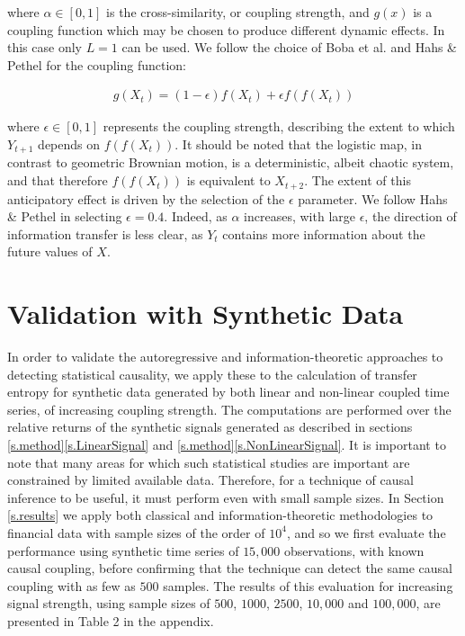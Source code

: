 \documentclass[]{rsos}%
\begin{document}
  where $ \alpha \in [0,1]$ is the cross-similarity, or coupling strength, and $g(x)$ is a coupling function which may be chosen to produce different dynamic effects. In this case only $L=1$ can be used. We follow the choice of Boba et al. \cite{boba2015efficient} and Hahs \& Pethel \cite{hahs2011distinguishing} for the coupling function:

  \begin{eqnarray}
    g(X_t) = (1-\epsilon) f(X_t) + \epsilon f(f(X_t)) 
    \label{eq:g(x)}
  \end{eqnarray}


 where $\epsilon \in [0,1]$ represents the coupling strength, describing the extent to which $Y_{t+1}$ depends on $f(f(X_t))$. It should be noted that the logistic map, in contrast to geometric Brownian motion, is a deterministic, albeit chaotic system, and that therefore $f(f(X_t))$ is equivalent to $X_{t+2}$. {\color{black} The extent of this anticipatory effect is driven by the selection of the $\epsilon$ parameter. We follow Hahs \& Pethel in selecting $\epsilon=0.4$. Indeed, as $\alpha$ increases, with large $\epsilon$, the direction of information transfer is less clear, as $Y_t$ contains more information about the future values of $X$. }



\section{Validation with Synthetic Data} \label{s.validation}

  In order to validate the autoregressive and information-theoretic approaches to detecting statistical causality, we apply these to the calculation of transfer entropy for synthetic data generated by both linear and non-linear coupled time series, of increasing coupling strength. 
  The computations are performed over the relative returns of the synthetic signals generated as described in sections \ref{s.method}\ref{s.LinearSignal} and \ref{s.method}\ref{s.NonLinearSignal}. 
  It is important to note that many areas for which such statistical studies are important are constrained by limited available data. Therefore, for a technique of causal inference to be useful, it must perform even with small sample sizes. In Section \ref{s.results} we apply both classical and information-theoretic methodologies to financial data with sample sizes of the order of $10^4$, and so we first evaluate the performance using synthetic time series of $15,000$ observations, with known causal coupling, before confirming that the technique can detect the same causal coupling with as few as $500$ samples. The results of this evaluation for increasing signal strength, using sample sizes of $500$, $1000$, $2500$, $10,000$ and $100,000$, are presented in Table 2 in the appendix.
\end{document}
